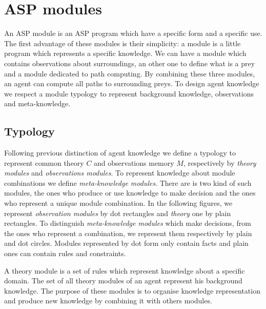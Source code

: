 \documentclass{aamas2012}
\begin{document}
\section{ASP modules}

	An ASP module is an ASP program which have a specific form and a specific use.
	The first advantage of these modules is their simplicity: a module is a little program which represents a specific knowledge.
	We can have a module which contains observations about surroundings,
	an other one to define what is a prey and a module dedicated to path computing.
	By combining these three modules, an agent can compute all paths to surrounding preys.
	To design agent knowledge we respect a module typology to represent background knowledge, observations and meta-knowledge.

\subsection{Typology}

	Following previous distinction of agent knowledge we define a typology to represent common theory $C$ and observations memory $M$,
	respectively by \emph{theory modules} and \emph{observations modules}.
	To represent knowledge about module combinations we define \emph{meta-knowledge modules}.
	There are is two kind of such modules, the ones who produce or use knowledge to make decision and the ones who represent a unique module combination.
	In the following figures, we represent \emph{observation modules} by dot rectangles and  \emph{theory} one by plain rectangles.
	To distinguish \emph{meta-knowledge modules} which make decisions, from the ones who represent a combination, we represent them respectively by plain and dot circles.
	Modules represented by dot form only contain facts and plain ones can contain rules and constraints.

	\begin{definition}
		A theory module is a set of rules which represent knowledge about a specific domain.
		The set of all theory modules of an agent represent his background knowledge.
		The purpose of these modules is to organise knowledge representation and produce
		new knowledge by combining it with others modules.
	\end{definition}
	
\end{document}
